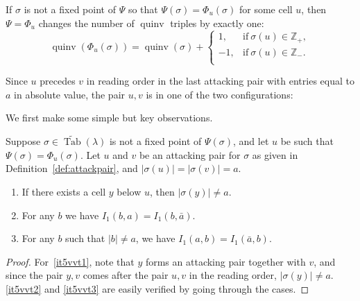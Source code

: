 \documentclass[ALCO,Unicode]{cedram}
\DeclareMathOperator{\PQT}{Tab}
\DeclareMathOperator{\quinv}{quinv}
\newcommand\cellL[4]{
\def\i{#1} \def\j{#2} \def\entry{#3} \def\labl{#4}
\draw (\j-1,-\i)--(\j,-\i)--(\j,-\i+1)--(\j-1,-\i+1)--(\j-1,-\i);
\node at (\j-.5,-\i+.5) {\entry};
\node at (\j-1.3,-\i+.8) {\tiny\labl};
}
\begin{document}
\begin{lemma}\label{lem:A1quinv}
If $\sigma$ is not a fixed point of $\Psi$ so that $\Psi(\sigma)=\Phi_u(\sigma)$ for some cell $u$, then $\Psi=\Phi_u$ changes the number of $\quinv$ triples by exactly one:
\[
\quinv(\Phi_u(\sigma))=\quinv(\sigma)+\begin{cases} 1,&\mbox{if}\ \sigma(u)\in\mathbb{Z}_+,\\ -1,&\mbox{if}\ \sigma(u)\in\mathbb{Z}_-.\\\end{cases}
\]
\end{lemma}

Since $u$ precedes $v$ in reading order in the last attacking pair with entries equal to $a$ in absolute value, the pair $u,v$ is in one of the two configurations:
\begin{center}
\end{center}

We first make some simple but key observations.

\begin{proposition}
\label{prop:attackpair}
Suppose $\sigma\in\widetilde{\PQT}(\lambda)$ is not a fixed point of $\Psi(\sigma)$, and let $u$ be such that $\Psi(\sigma)=\Phi_u(\sigma)$. Let $u$ and $v$ be an attacking pair for $\sigma$ as given in Definition~\ref{def:attackpair}, and $|\sigma(u)|
= |\sigma(v)| = a$.

\begin{enumerate}[label=(\arabic*)]
\item  \label{it5vvt1} If there exists a cell $y$ below $u$, then $|\sigma(y)| \neq a$.

\item \label{it5vvt2} For any $b$ we have $I_1(b,a)=I_1(b,\bar{a})$.

\item  \label{it5vvt3} For any $b$ such that $|b| \neq a$, we have $I_1(a,b)=I_1(\bar{a},b)$.
\end{enumerate}

\end{proposition}

\begin{proof}
For~\ref{it5vvt1}, note that $y$ forms an attacking pair together with $v$, and since the pair $y,v$ comes after the pair $u,v$ in the reading order, $|\sigma(y)| \neq a$. \ref{it5vvt2} and \ref{it5vvt3} are easily verified by going through the cases.
\end{proof}
\end{document}
